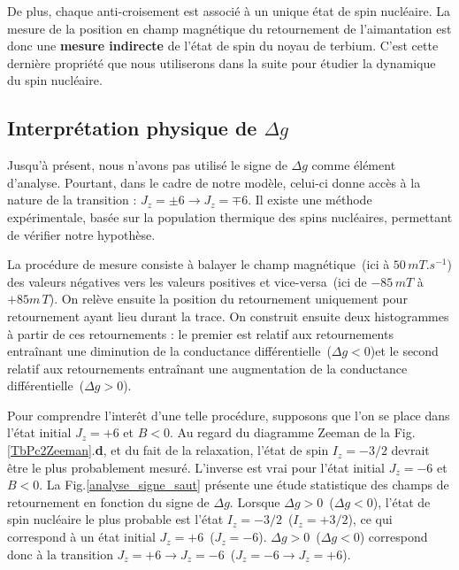 De plus, chaque anti-croisement est associé à un unique état de spin nucléaire. La mesure de la position en champ magnétique du retournement de l'aimantation est donc une \textbf{mesure indirecte} de l'état de spin du noyau de terbium. C'est cette dernière propriété que nous utiliserons dans la suite pour étudier la dynamique du spin nucléaire.

\subsection{Interprétation physique de $\Delta g$}
Jusqu'à présent, nous n'avons pas utilisé le signe de $\Delta g$ comme élément d'analyse. Pourtant, dans le cadre de notre modèle, celui-ci donne accès à la nature de la transition : $J_z = \pm6 \rightarrow J_z = \mp 6$. Il existe une méthode expérimentale, basée sur la population thermique des spins nucléaires, permettant de vérifier notre hypothèse.

La procédure de mesure consiste à balayer le champ magnétique~(ici à $50\,mT.s^{-1}$) des valeurs négatives vers les valeurs positives et vice-versa~(ici de $-85\,mT$ à $+85m\,T$). On relève ensuite la position du retournement uniquement pour retournement ayant lieu durant la trace. On construit ensuite deux histogrammes à partir de ces retournements : le premier est relatif aux retournements entraînant une diminution de la conductance différentielle~($\Delta g <0$)et le second relatif aux retournements entraînant une augmentation de la conductance différentielle~($\Delta g >0$).

Pour comprendre l'interêt d'une telle procédure, supposons que l'on se place dans l'état initial $J_z=+6$ et $B<0$. Au regard du diagramme Zeeman de la Fig.\ref{TbPc2Zeeman}.\textbf{d}, et du fait de la relaxation, l'état de spin $I_z = -3/2$ devrait être le plus probablement mesuré. L'inverse est vrai pour l'état initial $J_z=-6$ et $B<0$. La Fig.\ref{analyse_signe_saut} présente une étude statistique des champs de retournement en fonction du signe de $\Delta g$. Lorsque $\Delta g> 0$~($\Delta g< 0$), l'état de spin nucléaire le plus probable est l'état $I_z = -3/2$~($I_z = +3/2$), ce qui correspond à un état initial $J_z=+6$~($J_z=-6$). $\Delta g> 0$~($\Delta g< 0$) correspond donc à la transition $J_z = +6 \rightarrow J_z =  - 6$~($J_z = -6 \rightarrow J_z =  + 6$).

